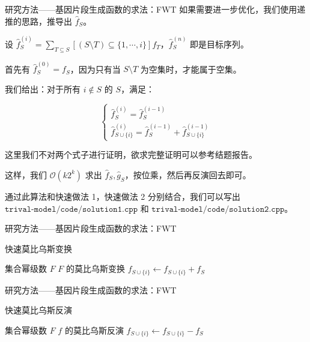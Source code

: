 \documentclass{beamer}
\begin{document}
	\begin{frame}{研究方法——基因片段生成函数的求法：FWT}
		如果需要进一步优化，我们使用递推的思路，推导出 $\hat f_S$。
		
		设 $\hat f_S^{(i)}=\sum_{T\subseteq S}[(S\setminus T)\subseteq\{1,\cdots,i\}]f_T$，$\hat f_S^{(n)}$ 即是目标序列。
		
		首先有 $\hat f_S^{(0)}=f_S$，因为只有当 $S \setminus T$ 为空集时，才能属于空集。
		
		我们给出：对于所有 $i\notin S$ 的 $S$，满足：
		
		$$
		\begin{cases}
			\hat f_S^{(i)}=\hat f_S^{(i-1)} \\
			\hat f_{S\cup\{i\}}^{(i)}=\hat f_S^{(i-1)}+\hat f_{S\cup\{i\}}^{(i-1)}
		\end{cases}
		$$
		
		这里我们不对两个式子进行证明，欲求完整证明可以参考结题报告。
		
		这样，我们 $\mathcal{O}(k2^k)$ 求出 $\hat f_S,\hat g_S$，按位乘，然后再反演回去即可。
		
		通过此算法和快速做法 1，快速做法 2 分别结合，我们可以写出 $\texttt{trival-model/code/solution1.cpp}$ 和 $\texttt{trival-model/code/solution2.cpp}$。
	\end{frame}

	\begin{frame}{研究方法——基因片段生成函数的求法：FWT}
		\begin{algorithm}[H]
			\caption{快速莫比乌斯变换}
			\begin{algorithmic}[1]
				\Require 集合幂级数 $F$
				\Ensure $F$ 的莫比乌斯变换
				\State $f_{S \cup \{i\}} \gets f_{S \cup \{i\}} + f_{S}$
				\EndFor
				\EndFor
				\State {}
				\EndFunction
			\end{algorithmic}
		\end{algorithm}
	\end{frame}

	\begin{frame}{研究方法——基因片段生成函数的求法：FWT}
		\begin{algorithm}[H]
			\caption{快速莫比乌斯反演}
			\begin{algorithmic}[1]
				\Require 集合幂级数 $F$
				\Ensure $f$ 的莫比乌斯反演
				\State $f_{S \cup \{i\}} \gets f_{S \cup \{i\}} - f_{S}$
				\EndFor
				\EndFor
				\State {}
				\EndFunction
			\end{algorithmic}
		\end{algorithm}
	\end{frame}
\end{document}
